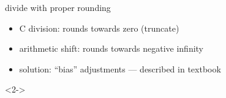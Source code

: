 \begin{frame}[fragile,label=divRounding]{divide with proper rounding}
    \begin{itemize}
        \item C division: rounds towards zero (truncate)
        \item arithmetic shift: rounds towards negative infinity
        \item solution: ``bias'' adjustments --- described in textbook
    \end{itemize}
\begin{visibleenv}<2->
\end{visibleenv}
\end{frame}
